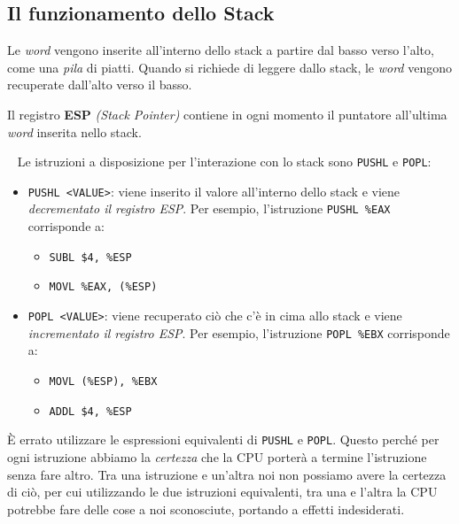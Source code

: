 \documentclass[a4paper,11pt,oneside]{book}
\begin{document}
\subsection{Il funzionamento dello Stack}
Le \emph{word} vengono inserite all'interno dello stack a partire dal basso verso l'alto, come una \emph{pila} di piatti.
Quando si richiede di leggere dallo stack, le \emph{word} vengono recuperate dall'alto verso il basso.

Il registro \textbf{ESP} \emph{(Stack Pointer)} contiene in ogni momento il puntatore all'ultima \emph{word} inserita nello stack.

~\newline
Le istruzioni a disposizione per l'interazione con lo stack sono \texttt{PUSHL} e \texttt{POPL}:
\begin{itemize}
    \item \texttt{PUSHL <VALUE>}: viene inserito il valore all'interno dello stack e viene \emph{decrementato il registro ESP}. \newline
    Per esempio, l'istruzione \texttt{PUSHL \%EAX} corrisponde a:
    \begin{itemize}
        \item \texttt{SUBL \$4, \%ESP}
        \item \texttt{MOVL \%EAX, (\%ESP)}
    \end{itemize}
    \item \texttt{POPL <VALUE>}: viene recuperato ciò che c'è in cima allo stack e viene \emph{incrementato il registro ESP}. \newline
    Per esempio, l'istruzione \texttt{POPL \%EBX} corrisponde a:
    \begin{itemize}
        \item \texttt{MOVL (\%ESP), \%EBX}
        \item \texttt{ADDL \$4, \%ESP}
    \end{itemize}
\end{itemize}
È errato utilizzare le espressioni equivalenti di \texttt{PUSHL} e \texttt{POPL}. Questo perché per ogni istruzione abbiamo la \emph{certezza} che la CPU
porterà a termine l'istruzione senza fare altro. Tra una istruzione e un'altra noi non possiamo avere la certezza di ciò, per cui utilizzando le due istruzioni equivalenti,
tra una e l'altra la CPU potrebbe fare delle cose a noi sconosciute, portando a effetti indesiderati.
\end{document}
